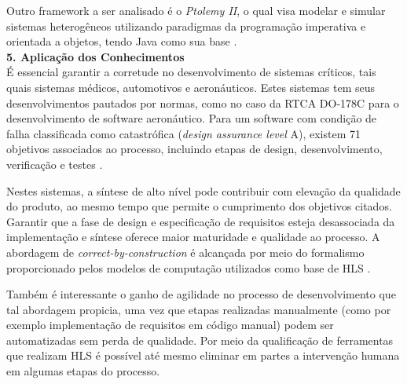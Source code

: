 Outro framework a ser analisado é o \emph{Ptolemy II}, o qual visa modelar e simular sistemas heterogêneos utilizando paradigmas da programação imperativa e orientada a objetos, tendo Java como sua base \cite{PtolemyII}.\\

\noindent
\textbf{5. Aplicação dos Conhecimentos}\\
É essencial garantir a corretude no desenvolvimento de sistemas críticos, tais quais sistemas médicos, automotivos e aeronáuticos. Estes sistemas tem seus desenvolvimentos pautados por normas, como no caso da RTCA DO-178C para o desenvolvimento de software aeronáutico. Para um software com condição de falha classificada como catastrófica (\emph{design assurance level} A), existem 71 objetivos associados ao processo, incluindo etapas de design, desenvolvimento, verificação e testes \cite{DO-178}.

Nestes sistemas, a síntese de alto nível pode contribuir com elevação da
qualidade do produto, ao mesmo tempo que permite o cumprimento dos objetivos
citados. Garantir que a fase de design e especificação de requisitos esteja
desassociada da implementação e síntese oferece maior maturidade e qualidade ao processo. A abordagem de \emph{correct-by-construction} é alcançada por meio do formalismo proporcionado pelos modelos de computação utilizados como base de HLS \cite{Edwards}.

Também é interessante o ganho de agilidade no processo de desenvolvimento que
tal abordagem propicia, uma vez que etapas realizadas manualmente (como por
exemplo implementação de requisitos em código manual) podem ser automatizadas
sem perda de qualidade. Por meio da qualificação de ferramentas que realizam HLS
é possível até mesmo eliminar em partes a intervenção humana em algumas etapas
do processo.


